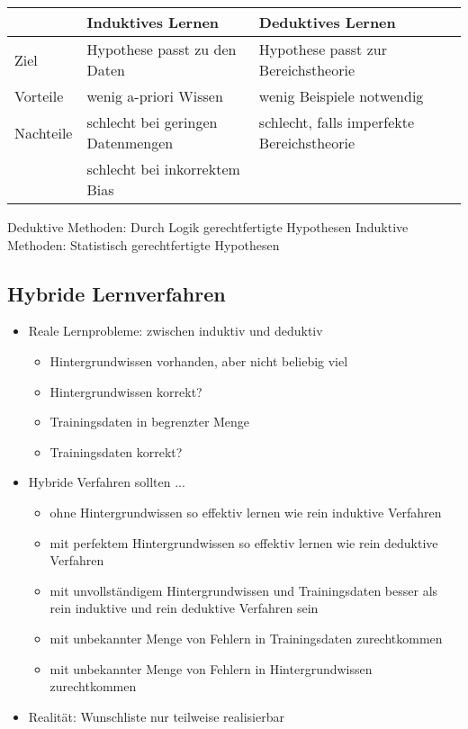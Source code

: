 \documentclass[paper=a4, fontsize=11pt]{scrartcl} %
\numberwithin{equation}{section} %
\numberwithin{figure}{section} %
\numberwithin{table}{section} %
\begin{document}
\begin{center}
    \begin{tabular}{ | l | l | l | p{5cm} |}
    \hline
    & Induktives Lernen & Deduktives Lernen \\ \hline
    Ziel & Hypothese passt zu den Daten & Hypothese passt zur Bereichstheorie\\ \hline
    Vorteile & wenig a-priori Wissen & wenig Beispiele notwendig\\ \hline
    Nachteile & schlecht bei geringen Datenmengen & schlecht, falls imperfekte Bereichstheorie\\
    & schlecht bei inkorrektem Bias &\\  
    \hline
    \end{tabular}
\end{center}

Deduktive Methoden: Durch Logik gerechtfertigte Hypothesen
Induktive Methoden: Statistisch gerechtfertigte Hypothesen

\subsection{Hybride Lernverfahren}

\begin{itemize}
\item Reale Lernprobleme: zwischen induktiv und deduktiv
\begin{itemize}
\item Hintergrundwissen vorhanden, aber nicht beliebig viel
\item Hintergrundwissen korrekt?
\item Trainingsdaten in begrenzter Menge
\item Trainingsdaten korrekt?
\end{itemize}
\item Hybride Verfahren sollten ...
\begin{itemize}
\item ohne Hintergrundwissen so effektiv lernen wie rein induktive Verfahren
\item mit perfektem Hintergrundwissen so effektiv lernen wie rein deduktive Verfahren
\item mit unvollständigem Hintergrundwissen und Trainingsdaten besser als rein induktive und rein deduktive Verfahren sein
\item mit unbekannter Menge von Fehlern in Trainingsdaten zurechtkommen
\item mit unbekannter Menge von Fehlern in Hintergrundwissen zurechtkommen
\end{itemize}
\item Realität: Wunschliste nur teilweise realisierbar
\end{itemize}
\end{document}
